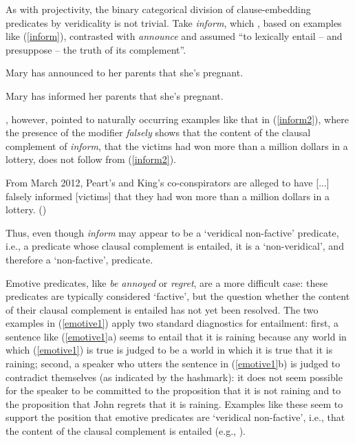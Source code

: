 \documentclass[11pt,fleqn]{article}
\newcommand{\6}{\mbox{$[\hspace*{-.6mm}[$}}
\newcommand{\9}{\mbox{$]\hspace*{-.6mm}]$}}
\begin{document}
As with projectivity, the binary categorical division of clause-embedding predicates by veridicality is not trivial. Take {\em inform}, which \citet[139]{schlenker10}, based on examples like (\ref{inform}), contrasted with {\em announce} and assumed ``to lexically entail -- and presuppose -- the truth of its complement''.

\begin{exe}
\ex\label{inform}

\begin{xlist}

\ex Mary has announced to her parents that she's pregnant.

\ex Mary has informed her parents that she's pregnant.

\end{xlist}
\end{exe}
\citet[76]{anand-hacquard2014}, however, pointed to naturally occurring examples like that in (\ref{inform2}), where the presence of the modifier {\em falsely} shows that the content of the clausal complement of {\em inform}, that the victims had won more than a million dollars in a lottery, does not follow from (\ref{inform2}).

\begin{exe}
\ex\label{inform2} From March 2012, Peart's and King's co-conspirators are alleged to have [...] falsely informed [victims] that they had won more than a million dollars in a lottery. \hfill (\citealt[76]{anand-hacquard2014})
\end{exe}
Thus, even though {\em inform} may appear to be a `veridical non-factive' predicate, i.e., a predicate whose clausal complement is entailed, it is a `non-veridical', and therefore  a `non-factive', predicate.

Emotive predicates, like  {\em be annoyed} or {\em regret}, are a more difficult case: these predicates are typically considered `factive', but the question whether the content of their clausal complement is entailed has not yet been resolved. The two examples in (\ref{emotive1}) apply two standard diagnostics for entailment: first, a sentence like (\ref{emotive1}a) seems to entail that it is raining because any world in which (\ref{emotive1}) is true is judged to be a world in which it is true that it is raining; second, a speaker who utters the sentence in (\ref{emotive1}b) is judged to contradict themselves (as indicated by the hashmark): it does not seem possible for the speaker to be committed to the proposition that it is not raining and to the proposition that John regrets that it is raining. Examples like these seem to support the position that emotive predicates are `veridical non-factive', i.e., that the content of the clausal complement is entailed (e.g., \citealt{gazdar79a,abrusan2011,anand-hacquard2014}).
\end{document}
